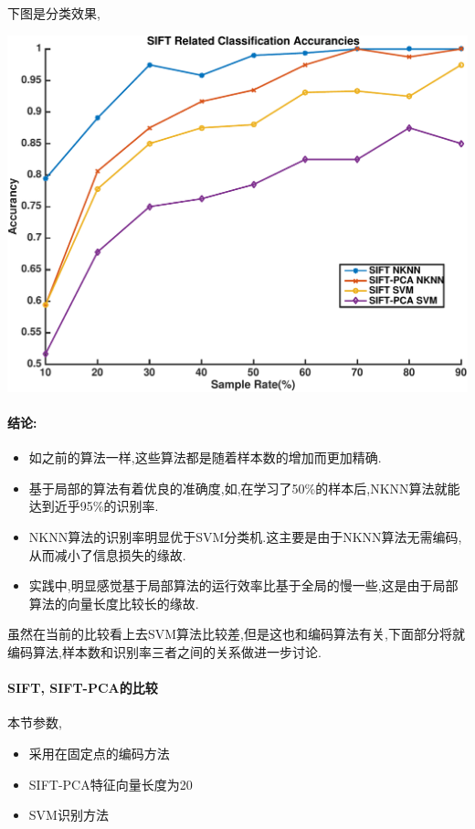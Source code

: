 下图是分类效果,


		\begin{center}
		\begin{minipage}[t]{\linewidth}
		\center
		{
		\includegraphics[width=\MyFactor\textwidth]{Img/c3/sift_classification} 
		}
		\end{minipage}
		\medskip
		\end{center}
		
\paragraph{结论:}
\begin{itemize}
	\item 如之前的算法一样,这些算法都是随着样本数的增加而更加精确.
	\item 基于局部的算法有着优良的准确度,如,在学习了50\%的样本后,NKNN算法就能达到近乎95\%的识别率.
	\item NKNN算法的识别率明显优于SVM分类机.这主要是由于NKNN算法无需编码,从而减小了信息损失的缘故.
	\item 实践中,明显感觉基于局部算法的运行效率比基于全局的慢一些,这是由于局部算法的向量长度比较长的缘故.
\end{itemize}

虽然在当前的比较看上去SVM算法比较差,但是这也和编码算法有关,下面部分将就编码算法,样本数和识别率三者之间的关系做进一步讨论.

\paragraph{SIFT, SIFT-PCA的比较}本节参数,
\begin{itemize}
	\item 采用在固定点的编码方法
	\item SIFT-PCA特征向量长度为20
	\item SVM识别方法
\end{itemize}

